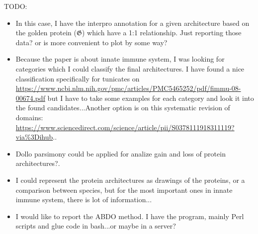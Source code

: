 \documentclass[11pt]{article}
\newcommand{\TODO}[1]{\begingroup\color{red}#1\endgroup}
\begin{document}
\TODO{TODO:}
\begin{itemize}
\item \TODO{In this case, I have the interpro annotation for a given architecture based
on the golden protein ($\boldsymbol{\mathfrak{G}}$) which have a 1:1 relationship. Just
reporting those data? or is more convenient to plot by some way?}
\item \TODO{Because the paper is about innate immune system, I was looking for 
categories which I could classify the final architectures. I have found a nice classification
specifically for tunicates on \url{https://www.ncbi.nlm.nih.gov/pmc/articles/PMC5465252/pdf/fimmu-08-00674.pdf} but I have to take some examples for each category and look it into
the found candidates...Another option is on this systematic revision of domains: \url{https://www.sciencedirect.com/science/article/pii/S0378111918311119?via\%3Dihub}.}.
\item \TODO{Dollo parsimony could be applied for analize gain and loss of protein architectures?.}
\item \TODO{I could represent the protein architectures as drawings of the proteins, or a comparison between species, but for the most important ones in innate immune system, there is lot of information...}
\item \TODO{I would like to report the ABDO method. I have the program, mainly Perl scripts and glue code in bash...or maybe in a server?}
\end{itemize}




\end{document}
